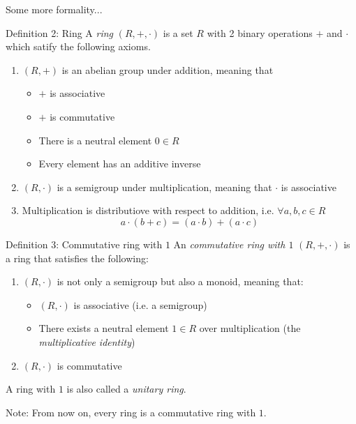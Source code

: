 \documentclass[12pt]{beamer}
\begin{document}
\begin{frame}{Some more formality...}
\begin{block}{Definition 2: Ring}
A \emph{ring} $(R, +, \cdot)$ is a set $R$ with 2 binary operations $+$ and $\cdot$ which satify
the following axioms.
\begin{enumerate}
\item $(R, +)$ is an abelian group under addition, meaning that
\begin{itemize}
\item $+$ is associative
\item $+$ is commutative
\item There is a neutral element $0 \in R$
\item Every element has an additive inverse
\end{itemize}
\item $(R, \cdot)$ is a semigroup under multiplication, meaning that $\cdot$ is associative
\item Multiplication is distributiove with respect to addition, i.e. $\forall a,b,c \in R$
\[
a \cdot (b+c) = (a\cdot b) + (a \cdot c)
\]
\end{enumerate}
\end{block}
\end{frame}

\begin{frame}{}
\begin{block}{Definition 3: Commutative ring with $1$}
An \emph{commutative ring with $1$} $(R,+,\cdot)$ is a ring that satisfies the following:
\begin{enumerate}
\item $(R, \cdot)$ is not only a semigroup but also a monoid, meaning that:
\begin{itemize}
\item $(R, \cdot)$ is associative (i.e. a semigroup)
\item There exists a neutral element $1 \in R$ over multiplication (the \emph{multiplicative identity})
\end{itemize}
\item $(R,\cdot)$ is commutative
\end{enumerate}
A ring with $1$ is also called a \emph{unitary ring}.
\end{block}
\pause
\begin{block}{Note:}
From now on, every ring is a commutative ring with $1$.
\end{block}
\end{frame}
\end{document}
